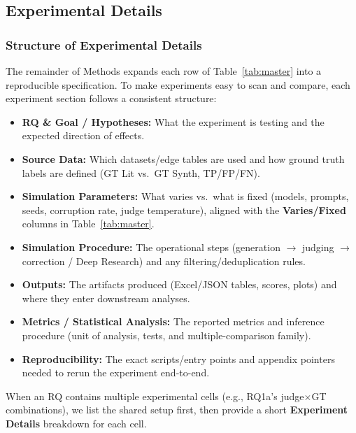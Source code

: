 \subsection{Experimental Details}
\label{sec:experimental_details}

\subsubsection{Structure of Experimental Details}
\label{sec:experiment_details_structure}

The remainder of Methods expands each row of Table~\ref{tab:master} into a reproducible specification. To make experiments easy to scan and compare, each experiment section follows a consistent structure:
\begin{itemize}[noitemsep]
    \item \textbf{RQ \& Goal / Hypotheses:} What the experiment is testing and the expected direction of effects.
    \item \textbf{Source Data:} Which datasets/edge tables are used and how ground truth labels are defined (GT Lit vs.\ GT Synth, TP/FP/FN).
    \item \textbf{Simulation Parameters:} What varies vs.\ what is fixed (models, prompts, seeds, corruption rate, judge temperature), aligned with the \textbf{Varies/Fixed} columns in Table~\ref{tab:master}.
    \item \textbf{Simulation Procedure:} The operational steps (generation $\rightarrow$ judging $\rightarrow$ correction / Deep Research) and any filtering/deduplication rules.
    \item \textbf{Outputs:} The artifacts produced (Excel/JSON tables, scores, plots) and where they enter downstream analyses.
    \item \textbf{Metrics / Statistical Analysis:} The reported metrics and inference procedure (unit of analysis, tests, and multiple-comparison family).
    \item \textbf{Reproducibility:} The exact scripts/entry points and appendix pointers needed to rerun the experiment end-to-end.
\end{itemize}

When an RQ contains multiple experimental cells (e.g., RQ1a’s judge$\times$GT combinations), we list the shared setup first, then provide a short \textbf{Experiment Details} breakdown for each cell.

\begingroup
\makeatletter
\renewcommand{\paragraph}[1]{\noindent\textbf{#1} }
\renewcommand{\subparagraph}[1]{\textbf{#1} }
\makeatother

